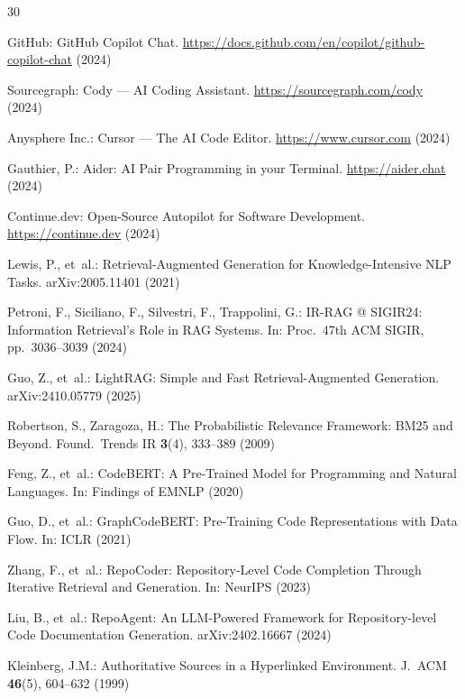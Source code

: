 \documentclass[runningheads]{llncs}
\begin{document}
\begin{thebibliography}{30}

GitHub: GitHub Copilot Chat.
\url{https://docs.github.com/en/copilot/github-copilot-chat} (2024)

Sourcegraph: Cody --- AI Coding Assistant.
\url{https://sourcegraph.com/cody} (2024)

Anysphere Inc.: Cursor --- The AI Code Editor.
\url{https://www.cursor.com} (2024)

Gauthier, P.: Aider: AI Pair Programming in your Terminal.
\url{https://aider.chat} (2024)

Continue.dev: Open-Source Autopilot for Software Development.
\url{https://continue.dev} (2024)

Lewis, P., et~al.: Retrieval-Augmented Generation for
Knowledge-Intensive NLP Tasks. arXiv:2005.11401 (2021)

Petroni, F., Siciliano, F., Silvestri, F., Trappolini, G.:
IR-RAG @ SIGIR24: Information Retrieval's Role in RAG Systems.
In: Proc.\ 47th ACM SIGIR, pp.\ 3036--3039 (2024)

Guo, Z., et~al.: LightRAG: Simple and Fast
Retrieval-Augmented Generation. arXiv:2410.05779 (2025)

Robertson, S., Zaragoza, H.: The Probabilistic Relevance
Framework: BM25 and Beyond.
Found.\ Trends IR \textbf{3}(4), 333--389 (2009)

Feng, Z., et~al.: CodeBERT: A Pre-Trained Model for Programming
and Natural Languages. In: Findings of EMNLP (2020)

Guo, D., et~al.: GraphCodeBERT: Pre-Training Code Representations
with Data Flow. In: ICLR (2021)

Zhang, F., et~al.: RepoCoder: Repository-Level Code Completion
Through Iterative Retrieval and Generation. In: NeurIPS (2023)

Liu, B., et~al.: RepoAgent: An LLM-Powered Framework for
Repository-level Code Documentation Generation.
arXiv:2402.16667 (2024)

Kleinberg, J.M.: Authoritative Sources in a Hyperlinked
Environment. J.\ ACM \textbf{46}(5), 604--632 (1999)


\end{thebibliography}
\end{document}
